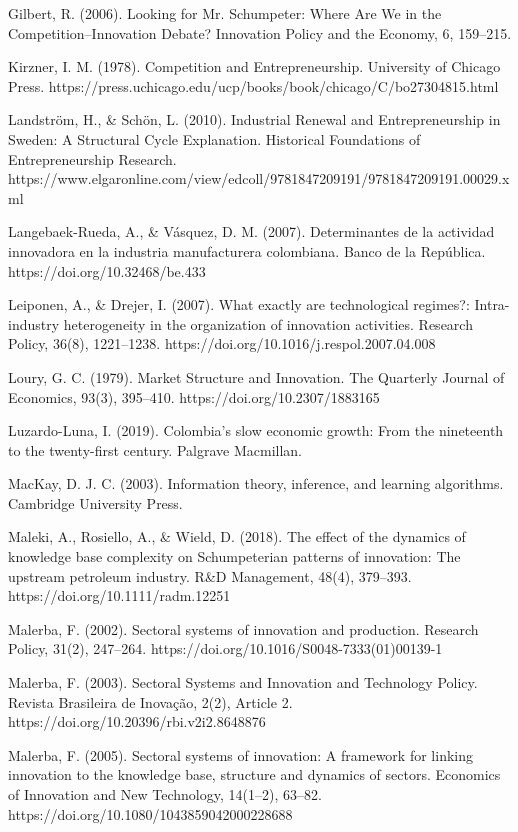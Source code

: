 \documentclass[12pt,a4paper]{article}
\begin{document}
{Gilbert, R. (2006). Looking for Mr. Schumpeter: Where Are We in the Competition--Innovation Debate? Innovation Policy and the Economy, 6, 159–215.

Kirzner, I. M. (1978). Competition and Entrepreneurship. University of Chicago Press. https://press.uchicago.edu/ucp/books/book/chicago/C/bo27304815.html

Landström, H., \& Schön, L. (2010). Industrial Renewal and Entrepreneurship in Sweden: A Structural Cycle Explanation. Historical Foundations of Entrepreneurship Research. https://www.elgaronline.com/view/edcoll/9781847209191/9781847209191.00029.xml

Langebaek-Rueda, A., \& Vásquez, D. M. (2007). Determinantes de la actividad innovadora en la industria manufacturera colombiana. Banco de la República. https://doi.org/10.32468/be.433

Leiponen, A., \& Drejer, I. (2007). What exactly are technological regimes?: Intra-industry heterogeneity in the organization of innovation activities. Research Policy, 36(8), 1221–1238. https://doi.org/10.1016/j.respol.2007.04.008

Loury, G. C. (1979). Market Structure and Innovation. The Quarterly Journal of Economics, 93(3), 395–410. https://doi.org/10.2307/1883165

Luzardo-Luna, I. (2019). Colombia’s slow economic growth: From the nineteenth to the twenty-first century. Palgrave Macmillan.

MacKay, D. J. C. (2003). Information theory, inference, and learning algorithms. Cambridge University Press.

Maleki, A., Rosiello, A., \& Wield, D. (2018). The effect of the dynamics of knowledge base complexity on Schumpeterian patterns of innovation: The upstream petroleum industry. R\&D Management, 48(4), 379–393. https://doi.org/10.1111/radm.12251

Malerba, F. (2002). Sectoral systems of innovation and production. Research Policy, 31(2), 247–264. https://doi.org/10.1016/S0048-7333(01)00139-1

Malerba, F. (2003). Sectoral Systems and Innovation and Technology Policy. Revista Brasileira de Inovação, 2(2), Article 2. https://doi.org/10.20396/rbi.v2i2.8648876

Malerba, F. (2005). Sectoral systems of innovation: A framework for linking innovation to the knowledge base, structure and dynamics of sectors. Economics of Innovation and New Technology, 14(1–2), 63–82. https://doi.org/10.1080/1043859042000228688

}
\end{document}

